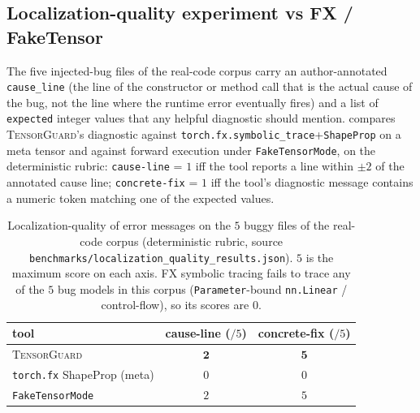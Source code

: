 \documentclass{article}
\theoremstyle{definition}
\begin{document}
\subsection{Localization-quality experiment vs FX / FakeTensor}
\label{sec:localization}

The five injected-bug files of the real-code corpus carry an
author-annotated \texttt{cause\_line} (the line of the constructor
or method call that is the actual cause of the bug, not the line
where the runtime error eventually fires) and a list of
\texttt{expected} integer values that any helpful diagnostic should
mention.  compares
\textsc{TensorGuard}'s diagnostic against
\verb|torch.fx.symbolic_trace|+\verb|ShapeProp| on a meta tensor
and against forward execution under \verb|FakeTensorMode|, on the
deterministic rubric: \texttt{cause-line} = $1$ iff the tool
reports a line within $\pm 2$ of the annotated cause line;
\texttt{concrete-fix} = $1$ iff the tool's diagnostic message
contains a numeric token matching one of the expected values.

\begin{table}[t]
\centering\small
\caption{Localization-quality of error messages on the $5$ buggy
files of the real-code corpus (deterministic rubric, source
\texttt{benchmarks/localization\_quality\_results.json}). $5$ is
the maximum score on each axis. FX symbolic tracing fails to
trace any of the $5$ bug models in this corpus
(\texttt{Parameter}-bound \texttt{nn.Linear} / control-flow), so
its scores are $0$.}
\label{tab:localization}
\begin{tabular}{lcc}
\toprule
tool & cause-line ($/5$) & concrete-fix ($/5$) \\
\midrule
\textsc{TensorGuard}                    & $\mathbf{2}$ & $\mathbf{5}$ \\
\verb|torch.fx| ShapeProp (meta)        & $0$          & $0$          \\
\verb|FakeTensorMode|                   & $2$          & $5$          \\
\bottomrule
\end{tabular}
\end{table}
\end{document}

